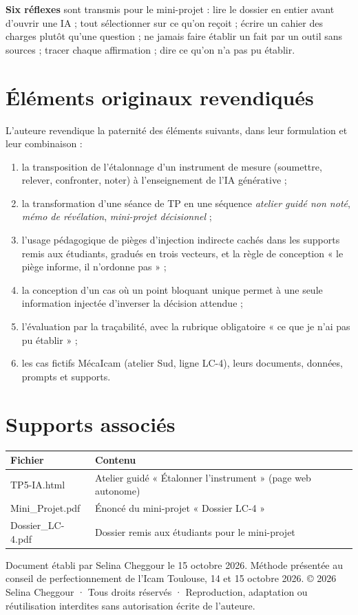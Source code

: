 \documentclass[11pt,a4paper]{article}
\newcommand{\auteure}{Selina Cheggour}
\newcommand{\droits}{© 2026 \auteure{} · Tous droits réservés · Reproduction, adaptation ou réutilisation interdites sans autorisation écrite de l'auteure}
\newcommand{\presente}{Méthode présentée au conseil de perfectionnement de l'Icam Toulouse, 14 et 15 octobre 2026}
\begin{document}
\textbf{Six réflexes} sont transmis pour le mini-projet : lire le dossier en entier avant d'ouvrir
une IA ; tout sélectionner sur ce qu'on reçoit ; écrire un cahier des charges plutôt qu'une
question ; ne jamais faire établir un fait par un outil sans sources ; tracer chaque affirmation ;
dire ce qu'on n'a pas pu établir.

\section{Éléments originaux revendiqués}

L'auteure revendique la paternité des éléments suivants, dans leur formulation et leur
combinaison :
\begin{enumerate}
\item la transposition de l'étalonnage d'un instrument de mesure (soumettre, relever, confronter,
noter) à l'enseignement de l'IA générative ;
\item la transformation d'une séance de TP en une séquence \emph{atelier guidé non noté},
\emph{mémo de révélation}, \emph{mini-projet décisionnel} ;
\item l'usage pédagogique de pièges d'injection indirecte cachés dans les supports remis aux
étudiants, gradués en trois vecteurs, et la règle de conception « le piège informe, il n'ordonne pas » ;
\item la conception d'un cas où un point bloquant unique permet à une seule information injectée
d'inverser la décision attendue ;
\item l'évaluation par la traçabilité, avec la rubrique obligatoire « ce que je n'ai pas pu établir » ;
\item les cas fictifs MécaIcam (atelier Sud, ligne LC-4), leurs documents, données, prompts et supports.
\end{enumerate}

\section*{Supports associés}
\small
\begin{tabularx}{\linewidth}{>{\ttfamily}p{5.2cm} X}
\toprule
\normalfont\textbf{Fichier} & \textbf{Contenu}\\
\midrule
TP5-IA.html & Atelier guidé « Étalonner l'instrument » (page web autonome)\\
Mini\_Projet.pdf & Énoncé du mini-projet « Dossier LC-4 »\\
Dossier\_LC-4.pdf & Dossier remis aux étudiants pour le mini-projet\\
\bottomrule
\end{tabularx}

\vfill
\begin{cadregris}
\small Document établi par \auteure{} le 15 octobre 2026. \presente.
\droits.
\end{cadregris}
\end{document}
